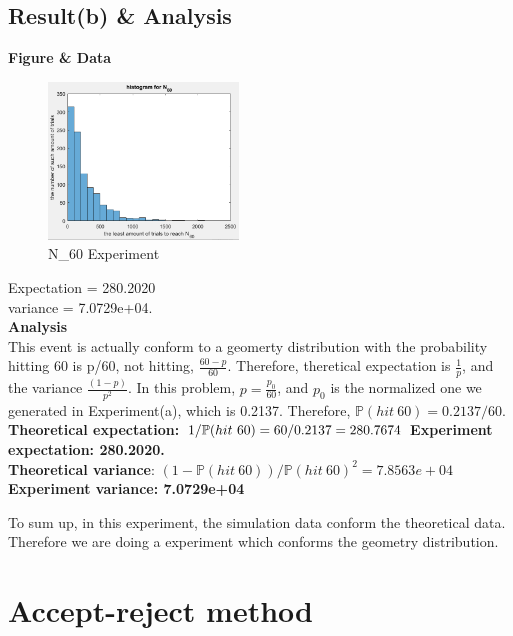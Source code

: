 \documentclass[twoside]{article}
\begin{document}
\subsection{\normalsize{Result(b) \&  Analysis}}
\begin{multicols}{2}
\noindent \textbf {Figure \& Data}
\begin{figure}[H]
   \centering
   \includegraphics[width = 0.45\textwidth]{../data/solution4_N60.png}  
   \caption{N\_60 Experiment}
\end{figure}
\noindent Expectation = 280.2020\\
\noindent variance = 7.0729e+04.\\
\noindent \textbf {Analysis}\\
This event is actually conform to a geomerty distribution with the probability hitting 60 is p/60, not hitting, $\frac{60-p}{60}$. Therefore, theretical expectation is $\frac{1}{p}$, and the variance $\frac{(1-p)}{p^2}$. In this problem, $p=\frac{p_0}{60}$, and $p_0$ is the normalized one we generated in Experiment(a), which is 0.2137. Therefore, $\mathbb{P}(hit \ 60)= 0.2137/60$.\\
\noindent \textbf {Theoretical expectation:} $1/\mathbb{P}(hit \ 60) = 60/0.2137=280.7674\\$
\noindent \textbf {Experiment expectation: 280.2020.}\\
\noindent \textbf {Theoretical variance}: $(1-\mathbb{P}(hit \ 60))/\mathbb{P}(hit\ 60)^2=7.8563e+04$\\
\noindent \textbf {Experiment variance: 7.0729e+04}\\
\end{multicols}
To sum up, in this experiment, the simulation data conform the theoretical data. Therefore we are doing a experiment which conforms the geometry distribution.\\

\section{Accept-reject method}
\end{document}

